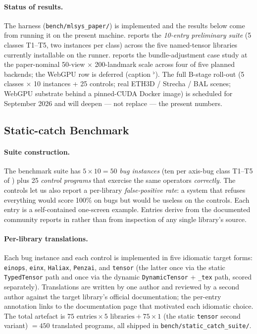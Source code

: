 \documentclass[10pt,twocolumn]{article}
\newcommand{\udltex}{\code{\_tex}}                            %
\newcommand{\code}[1]{\texttt{#1}}
\begin{document}
\paragraph{Status of results.}
The harness (\code{bench/mlsys\_paper/}) is implemented and the
results below come from running it on the present machine.
 reports the \emph{10-entry preliminary
suite} (5 classes T1--T5, two instances per class) across the
five named-tensor libraries currently installable on the runner.
 reports the bundle-adjustment case study at
the paper-nominal 50-view $\times$ 200-landmark scale across four
of five planned backends; the WebGPU row is deferred (caption
$^\flat$). The full B-stage roll-out (5 classes $\times$ 10
instances + 25 controls; real ETH3D / Strecha / BAL scenes;
WebGPU substrate behind a pinned-CUDA Docker image) is scheduled
for September 2026 and will deepen --- not replace --- the
present numbers.

\subsection{Static-catch Benchmark}
\label{sec:eval-static}

\paragraph{Suite construction.}
The benchmark suite has $5 \times 10 = 50$ \emph{bug instances}
(ten per axis-bug class T1--T5 of ) plus 25
\emph{control programs} that exercise the same operators
\emph{correctly}. The controls let us also report a per-library
\emph{false-positive rate}: a system that refuses everything would
score 100\% on bugs but would be useless on the controls. Each entry
is a self-contained one-screen example. Entries derive from the
documented community reports in  rather than
from inspection of any single library's source.

\paragraph{Per-library translations.}
Each bug instance and each control is implemented in five idiomatic
target forms: \code{einops}, \code{einx}, \code{Haliax},
\code{Penzai}, and \code{tensor} (the latter once via the static
\code{TypedTensor} path and once via the dynamic \code{DynamicTensor}
+ \udltex{} path, scored separately). Translations are written by
one author and reviewed by a second author against the target
library's official documentation; the per-entry annotation links to
the documentation page that motivated each idiomatic choice. The
total artefact is $75 \text{ entries} \times 5 \text{ libraries} +
75 \times 1$ (the static \code{tensor} second variant)
$ = 450$ translated programs, all shipped in
\code{bench/static\_catch\_suite/}.
\end{document}
